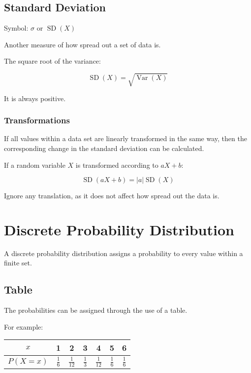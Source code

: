 \documentclass[a4paper,11pt]{article}
\DeclareMathOperator\Var{Var}
\DeclareMathOperator\SD{SD}
\begin{document}
\subsection{Standard Deviation}

Symbol: $\sigma$ or $\SD(X)$

Another measure of how spread out a set of data is.

The square root of the variance:

$$
\SD(X) = \sqrt{\Var(X)}
$$

It is always positive.


\subsubsection{Transformations}

If all values within a data set are linearly transformed in the same way, then
the corresponding change in the standard deviation can be calculated.

If a random variable $X$ is transformed according to $aX + b$:

$$
\SD(aX + b) = |a| \SD(X)
$$

Ignore any translation, as it does not affect how spread out the data is.





\section{Discrete Probability Distribution}

A discrete probability distribution assigns a probability to every value within
a finite set.


\subsection{Table}

The probabilities can be assigned through the use of a table.

For example:

\begin{center}
\begin{tabular}{c|c|c|c|c|c|c}
$x$ & 1 & 2 & 3 & 4 & 5 & 6 \\
\hline
$P(X = x)$ & $\frac{1}{6}$ & $\frac{1}{12}$ & $\frac{1}{3}$ & $\frac{1}{12}$ & $\frac{1}{6}$ & $\frac{1}{6}$ \\
\end{tabular}
\end{center}
\end{document}
